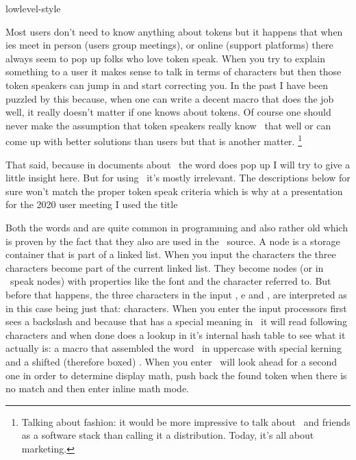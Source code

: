 
\environment lowlevel-style


\startdocument
  [title=tokens,
   color=middleblue]

\startsectionlevel[title=Introduction]

Most users don't need to know anything about tokens but it happens that when \TEX
ies meet in person (users group meetings), or online (support platforms) there
always seem to pop up folks who love token speak. When you try to explain
something to a user it makes sense to talk in terms of characters but then those
token speakers can jump in and start correcting you. In the past I have been
puzzled by this because, when one can write a decent macro that does the job
well, it really doesn't matter if one knows about tokens. Of course one should
never make the assumption that token speakers really know \TEX\ that well or can
come up with better solutions than users but that is another matter. \footnote
{Talking about fashion: it would be more impressive to talk about \TEX\ and
friends as a software stack than calling it a distribution. Today, it's all about
marketing.}

That said, because in documents about \TEX\ the word  does pop up I
will try to give a little insight here. But for using \TEX\ it's mostly
irrelevant. The descriptions below for sure won't match the proper token speak
criteria which is why at a presentation for the 2020 user meeting I used the
title 

\stopsectionlevel

\startsectionlevel[title=What are tokens]

Both the words  and  are quite common in programming
and also rather old which is proven by the fact that they also are used in the
\TEX\ source. A node is a storage container that is part of a linked list. When
you input the characters  the three characters become part of the
current linked list. They become  nodes (or in \LUATEX\ speak
 nodes) with properties like the font and the character referred
to. But before that happens, the three characters in the input , \type
{e} and , are interpreted as in this case being just that: characters.
When you enter \type {\TeX} the input processors first sees a backslash and
because that has a special meaning in \TEX\ it will read following characters and
when done does a lookup in it's internal hash table to see what it actually is: a
macro that assembled the word \TEX\ in uppercase with special kerning and a
shifted (therefore boxed) . When you enter \type {$} \TEX\ will look
ahead for a second one in order to determine display math, push back the found
token when there is no match and then enter inline math mode.

